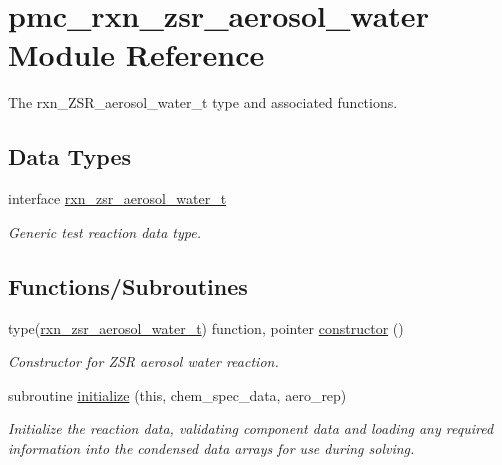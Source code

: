 \hypertarget{namespacepmc__rxn__zsr__aerosol__water}{}\section{pmc\+\_\+rxn\+\_\+zsr\+\_\+aerosol\+\_\+water Module Reference}
\label{namespacepmc__rxn__zsr__aerosol__water}


The rxn\+\_\+\+Z\+S\+R\+\_\+aerosol\+\_\+water\+\_\+t type and associated functions.  


\subsection*{Data Types}
\begin{DoxyCompactItemize}
\item 
interface \mbox{\hyperlink{structpmc__rxn__zsr__aerosol__water_1_1rxn__zsr__aerosol__water__t}{rxn\+\_\+zsr\+\_\+aerosol\+\_\+water\+\_\+t}}
\begin{DoxyCompactList}\small\item\em Generic test reaction data type. \end{DoxyCompactList}\end{DoxyCompactItemize}
\subsection*{Functions/\+Subroutines}
\begin{DoxyCompactItemize}
\item 
type(\mbox{\hyperlink{structpmc__rxn__zsr__aerosol__water_1_1rxn__zsr__aerosol__water__t}{rxn\+\_\+zsr\+\_\+aerosol\+\_\+water\+\_\+t}}) function, pointer \mbox{\hyperlink{namespacepmc__rxn__zsr__aerosol__water_a3ceff195484eeb2afb745aeb4ab31ddb}{constructor}} ()
\begin{DoxyCompactList}\small\item\em Constructor for Z\+SR aerosol water reaction. \end{DoxyCompactList}\item 
subroutine \mbox{\hyperlink{namespacepmc__rxn__zsr__aerosol__water_ad28f0d91114d117e54d04c9b3cbe21dc}{initialize}} (this, chem\+\_\+spec\+\_\+data, aero\+\_\+rep)
\begin{DoxyCompactList}\small\item\em Initialize the reaction data, validating component data and loading any required information into the condensed data arrays for use during solving. \end{DoxyCompactList}\end{DoxyCompactItemize}



